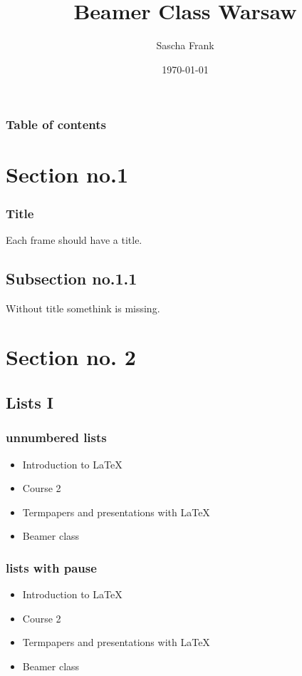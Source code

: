\documentclass{beamer}
\begin{document}
\title{Beamer Class Warsaw}  
\author{Sascha Frank}
\date{\today} 


\begin{frame}
\titlepage
\end{frame}

\begin{frame}\frametitle{Table of contents}\tableofcontents
\end{frame} 


\section{Section no.1} 
\begin{frame}\frametitle{Title} 
Each frame should have a title.
\end{frame}
\subsection{Subsection no.1.1  }
\begin{frame} 
Without title somethink is missing. 
\end{frame}


\section{Section no. 2} 
\subsection{Lists I}
\begin{frame}\frametitle{unnumbered lists}
\begin{itemize}
\item Introduction to  \LaTeX  
\item Course 2 
\item Termpapers and presentations with \LaTeX 
\item Beamer class
\end{itemize} 
\end{frame}

\begin{frame}\frametitle{lists with pause}
\begin{itemize}
\item Introduction to  \LaTeX \pause 
\item Course 2 \pause 
\item Termpapers and presentations with \LaTeX \pause 
\item Beamer class
\end{itemize} 
\end{frame}
\end{document}
